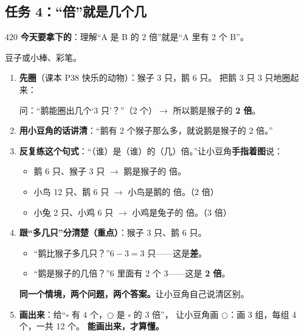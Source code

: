 \subsection{任务 4：“倍”就是几个几}

\begin{lesson}{4}{20}
\textbf{今天要拿下的}：理解“A 是 B 的 2 倍”就是“A 里有 2 个 B”。

\begin{materials}
豆子或小棒、彩笔。
\end{materials}

\begin{enumerate}
  \item \textbf{先圈}（课本 P38 快乐的动物）：猴子 3 只，鹅 6 只。
        把鹅 3 只 3 只地圈起来：
        \begin{center}
        \end{center}
        问：“鹅能圈出几个‘3 只’？”（2 个）$\to$ 所以鹅是猴子的 \textbf{2 倍}。
  \item \textbf{用小豆角的话讲清}：“鹅有 2 个猴子那么多，就说鹅是猴子的 2 倍。”
  \item \textbf{反复练这个句式}：“（谁）是（谁）的（几）倍。”让小豆角\textbf{手指着图}说：
        \begin{itemize}
          \item 鹅 6 只、猴子 3 只 $\to$ 鹅是猴子的 \blank 倍。
          \item 小鸟 12 只、鹅 6 只 $\to$ 小鸟是鹅的 \blank 倍。（2 倍）
          \item 小兔 2 只、小鸡 6 只 $\to$ 小鸡是兔子的 \blank 倍。（3 倍）
        \end{itemize}
  \item \textbf{跟“多几只”分清楚（重点）}：猴子 3 只、鹅 6 只。
        \begin{itemize}
          \item “鹅比猴子多几只？”$6-3=3$ 只——这是\textbf{差}。
          \item “鹅是猴子的几倍？”$6$ 里面有 2 个 3——这是 \textbf{2 倍}。
        \end{itemize}
        \textbf{同一个情境，两个问题，两个答案。}让小豆角自己说清区别。
  \item \textbf{画出来}：给“$\square$ 有 4 个，$\bigcirc$ 是 $\square$ 的 3 倍”，
        让小豆角画 $\bigcirc$：画 3 组，每组 4 个，一共 12 个。
        \textbf{能画出来，才算懂。}
\end{enumerate}


\end{lesson}
